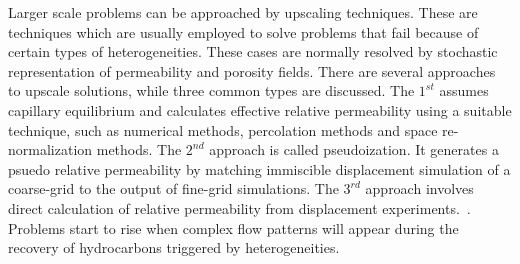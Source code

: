 \documentclass[preprint,authoryear,12pt]{elsarticle}
\newcommand{\JGnote}[1]{\fbox{\parbox{\textwidth}{ \color{red} JG Note $\Rightarrow$ #1}}}
\begin{document}
Larger scale problems can be approached by upscaling techniques. These are techniques which are usually employed to solve problems that fail because of certain types of heterogeneities. These cases are normally resolved by stochastic representation of permeability and porosity fields. There are several approaches to upscale solutions, while three common types are discussed. The $1^{st}$ assumes capillary equilibrium and calculates effective relative permeability using a suitable technique, such as numerical methods, percolation methods and space re-normalization methods. The $2^{nd}$ approach is called pseudoization. It generates a psuedo relative permeability by matching immiscible displacement simulation of a coarse-grid to the output of fine-grid simulations. The $3^{rd}$ approach involves direct calculation of relative permeability from displacement experiments.~\citep{johnson_1959, jones_1978}. Problems start to rise when complex flow patterns will appear during the recovery of hydrocarbons triggered by heterogeneities.  

\end{document}
